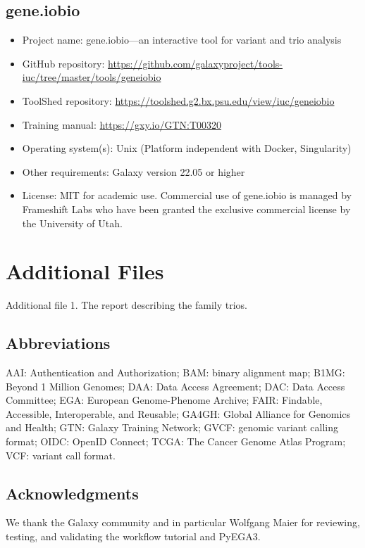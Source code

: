 \subsection*{gene.iobio}
\begin{itemize}
    \item Project name: gene.iobio—an interactive tool for variant and trio analysis
    \item GitHub repository: \url{https://github.com/galaxyproject/tools-iuc/tree/master/tools/geneiobio}
    \item ToolShed repository: \url{https://toolshed.g2.bx.psu.edu/view/iuc/geneiobio}
    \item Training manual: \url{https://gxy.io/GTN:T00320}
    \item Operating system(s): Unix (Platform independent with Docker, Singularity)
    \item Other requirements: Galaxy version 22.05 or higher
    \item License: MIT for academic use. Commercial use of gene.iobio is managed by Frameshift Labs who have been granted the exclusive commercial license by the University of Utah.
\end{itemize}

\section*{Additional Files}
Additional file 1. The report describing the family trios.

\subsection*{Abbreviations}
AAI: Authentication and Authorization; BAM: binary alignment map; B1MG: Beyond 1 Million Genomes; DAA: Data Access Agreement; DAC: Data Access Committee; EGA: European Genome-Phenome Archive; FAIR: Findable, Accessible, Interoperable, and Reusable; GA4GH: Global Alliance for Genomics and Health; GTN: Galaxy Training Network; GVCF: genomic variant calling format; OIDC: OpenID Connect; TCGA: The Cancer Genome Atlas Program; VCF: variant call format.

\subsection*{Acknowledgments}

We thank the Galaxy community and in particular Wolfgang Maier for reviewing, testing, and validating the workflow tutorial and PyEGA3.

